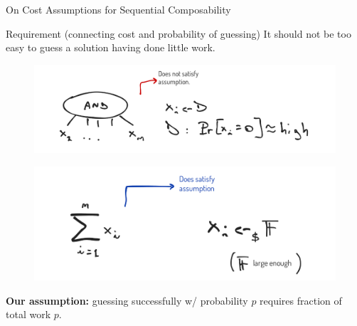 \begin{frame}{On Cost Assumptions for Sequential Composability}
\begin{block}{Requirement (connecting cost and probability of guessing)}\pause
{\small 	It should not be too easy to guess a solution having done little work.} 
\end{block}	
	
\pause
\begin{figure}
	\includegraphics[scale=0.21]{pics/example-and.png}
\end{figure}
\pause
\begin{figure}
	\includegraphics[scale=0.21]{pics/example-sum.png}
\end{figure}
\pause
\textbf{Our assumption:} guessing successfully w/ probability $p$ requires fraction of total work $p$.
\end{frame}